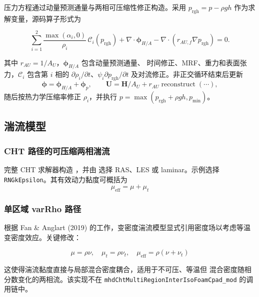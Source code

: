 \documentclass[11pt,a4paper]{article}
\begin{document}
压力方程通过动量预测通量与两相可压缩性修正构造。采用
$p_{\text{rgh}}=p-\rho gh$ 作为求解变量，源码算子形式为

\begin{equation}
\sum_{i=1}^{2}
\frac{\max(\alpha_i,0)}{\rho_i}\,
\mathcal{C}_i(p_{\text{rgh}})
+\nabla\cdot\boldsymbol{\phi}_{H/A}
-\nabla\cdot\left(r_{AU,f}\nabla p_{\text{rgh}}\right)=0 .
\label{eq:pEqn}
\end{equation}

其中 $r_{AU}=1/A_U$，$\boldsymbol{\phi}_{H/A}$ 包含动量预测通量、
时间修正、MRF、重力和表面张力，$\mathcal{C}_i$ 包含第 $i$ 相的
$\partial\rho_i/\partial t$、$\psi_i\partial p_{\text{rgh}}/\partial t$
及对流修正。非正交循环结束后更新
\[
\boldsymbol{\phi}=\boldsymbol{\phi}_{H/A}+\boldsymbol{\phi}_p,\qquad
\mathbf{U}=\mathbf{H}/A_U+r_{AU}\operatorname{reconstruct}(\cdots),
\]
随后按热力学压缩率修正 $\rho_i$，并执行
$p=\max(p_{\text{rgh}}+\rho gh,p_{\min})$。

\subsection{湍流模型}

\subsubsection{CHT 路径的可压缩两相湍流}

完整 CHT 求解器构造
，并由
 选择 RAS、LES 或
laminar。示例选择 \texttt{RNGkEpsilon}。其有效动力黏度可概括为
\begin{equation}
\mu_{\text{eff}} = \mu + \mu_t
\end{equation}

\subsubsection{单区域 varRho 路径}

根据 Fan \& Anglart (2019)\cite{Fan2019} 的工作，变密度湍流模型显式引用密度场以考虑等温变密度效应。关键修改：

\begin{equation}
\mu = \rho \nu, \quad \mu_t = \rho \nu_t, \quad \mu_{\text{eff}} = \rho(\nu + \nu_t)
\end{equation}

这使得湍流黏度直接与局部混合密度耦合，适用于不可压、等温但
混合密度随相分数变化的两相流。该实现不在
\texttt{mhdChtMultiRegionInterIsoFoamCpad\_mod} 的调用链中。
\end{document}
